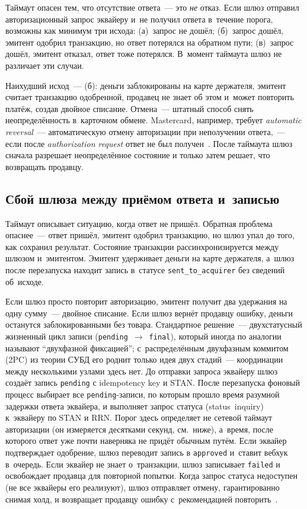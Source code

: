 Таймаут опасен тем, что отсутствие ответа~--- это \emph{не}
отказ. Если шлюз отправил авторизационный запрос эквайеру
и~не получил ответа в~течение порога, возможны как минимум
три исхода: (а)~запрос не дошёл; (б)~запрос дошёл,
эмитент одобрил транзакцию, но ответ потерялся на обратном пути;
(в)~запрос дошёл, эмитент отказал, ответ тоже потерялся.
В~момент таймаута шлюз не различает эти случаи.

Наихудший исход~--- (б): деньги заблокированы на карте
держателя, эмитент считает транзакцию одобренной, продавец
не знает об этом и~может повторить платёж, создав двойное списание.
Отмена~--- штатный способ снять неопределённость в~карточном
обмене. Mastercard, например, требует \textit{automatic reversal}~---
автоматическую отмену авторизации при неполучении ответа,~---
если после \textit{authorization request} ответ не был получен~\cite{mc-tpr}.
После таймаута шлюз сначала разрешает неопределённое состояние
и только затем решает, что возвращать продавцу.

\subsection*{Сбой шлюза между приёмом ответа и~записью}

Таймаут описывает ситуацию, когда ответ не пришёл. Обратная
проблема опаснее~--- ответ пришёл, эмитент одобрил транзакцию,
но шлюз упал до того, как сохранил результат. Состояние
транзакции рассинхронизируется между шлюзом и~эмитентом.
Эмитент удерживает деньги на карте
держателя, а~шлюз после перезапуска находит запись в~статусе
\texttt{sent\_to\_acquirer} без сведений об~исходе.

Если шлюз просто повторит авторизацию, эмитент получит два
удержания на одну сумму~--- двойное списание. Если шлюз вернёт
продавцу ошибку, деньги останутся заблокированными без
товара. Стандартное решение~--- двухстатусный жизненный цикл
записи (\texttt{pending}~$\to$~\texttt{final}), который иногда
по аналогии называют \enquote{двухфазной фиксацией}; с~распределённым
двухфазным коммитом (2PC) из теории СУБД его роднит только идея
двух стадий~--- координации между несколькими узлами здесь нет.
До отправки запроса эквайеру шлюз создаёт запись
\texttt{pending} с idempotency key и STAN. После перезапуска
фоновый процесс выбирает все \texttt{pending}-записи, по которым
прошло время разумной задержки ответа эквайера, и выполняет
запрос статуса (status~inquiry) к~эквайеру по STAN и RRN. Порог
здесь определяет не сетевой таймаут авторизации (он измеряется
десятками секунд, см.~ниже), а~время, после которого ответ уже
почти наверняка не придёт обычным путём. Если эквайер подтверждает одобрение, шлюз переводит
запись в \texttt{approved} и~ставит вебхук в~очередь. Если
эквайер не знает о~транзакции, шлюз записывает
\texttt{failed} и освобождает продавца для повторной попытки.
Когда запрос статуса недоступен (не все эквайеры его
реализуют), шлюз отправляет отмену, гарантированно
снимая холд, и возвращает продавцу ошибку с~рекомендацией
повторить~\cite{mc-tpr}.

